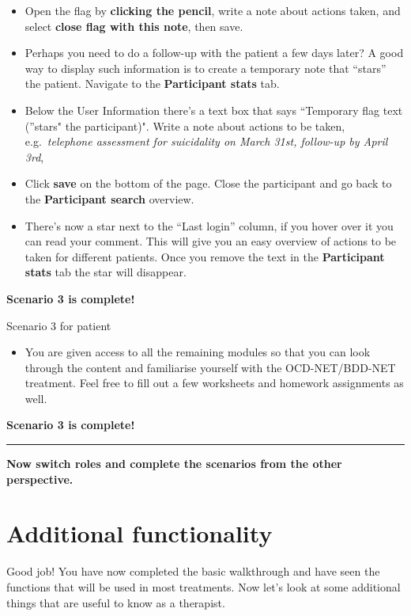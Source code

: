\documentclass[]{book}
\providecommand{\tightlist}{%
  \setlength{\itemsep}{0pt}\setlength{\parskip}{0pt}}
\begin{document}
\begin{itemize}
\item
  Open the flag by \textbf{clicking the pencil}, write a note about actions taken, and select \textbf{close flag with this note}, then save.
\item
  Perhaps you need to do a follow-up with the patient a few days later? A good way to display such information is to create a temporary note that ``stars'' the patient. Navigate to the \textbf{Participant stats} tab.
\item
  Below the User Information there's a text box that says ``Temporary flag text (''stars" the participant)". Write a note about actions to be taken, e.g.~\emph{telephone assessment for suicidality on March 31st, follow-up by April 3rd},
\item
  Click \textbf{save} on the bottom of the page. Close the participant and go back to the \textbf{Participant search} overview.
\item
  There's now a star next to the ``Last login'' column, if you hover over it you can read your comment. This will give you an easy overview of actions to be taken for different patients. Once you remove the text in the \textbf{Participant stats} tab the star will disappear.
\end{itemize}

\textbf{Scenario 3 is complete!}

Scenario 3 for patient

\begin{itemize}
\tightlist
\item
  You are given access to all the remaining modules so that you can look through the content and familiarise yourself with the OCD-NET/BDD-NET treatment. Feel free to fill out a few worksheets and homework assignments as well.
\end{itemize}

\textbf{Scenario 3 is complete!}

\begin{center}\rule{0.5\linewidth}{\linethickness}\end{center}

\textbf{Now switch roles and complete the scenarios from the other perspective.}

\hypertarget{additional-functionality}{%
\section{Additional functionality}\label{additional-functionality}}

Good job! You have now completed the basic walkthrough and have seen the functions that will be used in most treatments. Now let's look at some additional things that are useful to know as a therapist.
\end{document}
